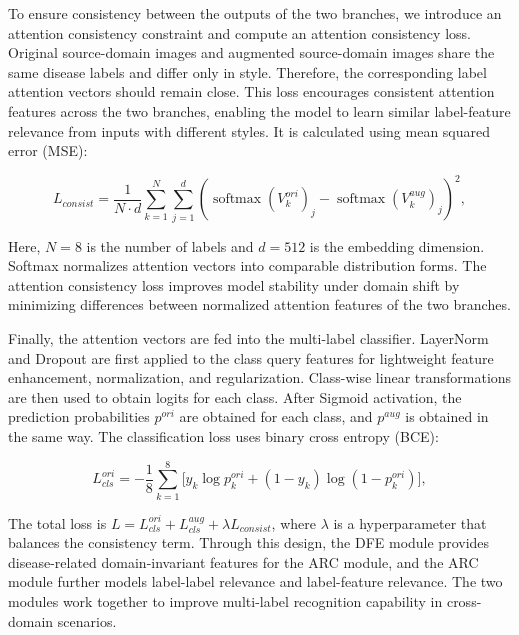 To ensure consistency between the outputs of the two branches, we introduce an attention consistency constraint and compute an attention consistency loss. Original source-domain images and augmented source-domain images share the same disease labels and differ only in style. Therefore, the corresponding label attention vectors should remain close. This loss encourages consistent attention features across the two branches, enabling the model to learn similar label-feature relevance from inputs with different styles. It is calculated using mean squared error (MSE):

\begin{equation}\label{eq:consistency-loss}
L_{consist} = \frac{1}{N \cdot d}\sum_{k = 1}^{N}\sum_{j = 1}^{d}
\left(
\operatorname{softmax}\left( V_{k}^{ori} \right)_{j}
-
\operatorname{softmax}\left( V_{k}^{aug} \right)_{j}
\right)^{2},
\end{equation}

Here, \(N = 8\) is the number of labels and \(d = 512\) is the embedding dimension. Softmax normalizes attention vectors into comparable distribution forms. The attention consistency loss improves model stability under domain shift by minimizing differences between normalized attention features of the two branches.

Finally, the attention vectors are fed into the multi-label classifier. LayerNorm and Dropout are first applied to the class query features for lightweight feature enhancement, normalization, and regularization. Class-wise linear transformations are then used to obtain logits for each class. After Sigmoid activation, the prediction probabilities \(p^{ori}\) are obtained for each class, and \(p^{aug}\) is obtained in the same way. The classification loss uses binary cross entropy (BCE):

\begin{equation}\label{eq:cls-loss}
L_{cls}^{ori} = - \frac{1}{8}\sum_{k = 1}^{8}{\lbrack y_{k}\log p_{k}^{ori} + (1 - y_{k})\log(1 - p_{k}^{ori})\rbrack},
\end{equation}

The total loss is \(L = L_{cls}^{ori} + L_{cls}^{aug} + \lambda L_{consist}\), where \(\lambda\) is a hyperparameter that balances the consistency term. Through this design, the DFE module provides disease-related domain-invariant features for the ARC module, and the ARC module further models label-label relevance and label-feature relevance. The two modules work together to improve multi-label recognition capability in cross-domain scenarios.

